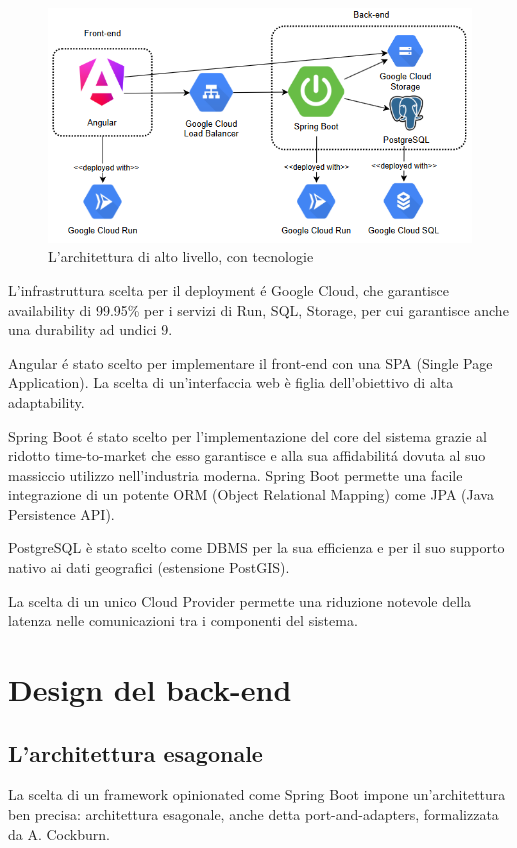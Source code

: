 \begin{figure}[h]
    \centering
    \includegraphics[width=\textwidth]{assets/diagrams/high-level-arch-tecnologies.png}
    \caption{L'architettura di alto livello, con tecnologie}
    \label{fig:Architettura di alto livello, con tecnologie}
\end{figure}

L'infrastruttura scelta per il deployment é Google Cloud, che garantisce availability 
di 99.95\% per i servizi di Run, SQL, Storage, per cui garantisce anche una durability 
ad undici 9.

Angular é stato scelto per implementare il front-end con una SPA (Single Page 
Application). La scelta di un'interfaccia web è figlia dell'obiettivo di alta 
adaptability.

Spring Boot é stato scelto per l'implementazione del core del sistema grazie al ridotto 
time-to-market che esso garantisce e alla sua affidabilitá dovuta al suo massiccio 
utilizzo nell'industria moderna. Spring Boot permette una facile integrazione di un 
potente ORM (Object Relational Mapping) come JPA (Java Persistence API).

PostgreSQL è stato scelto come DBMS per la sua efficienza e per il suo supporto nativo 
ai dati geografici (estensione PostGIS).

La scelta di un unico Cloud Provider permette una riduzione notevole della latenza nelle 
comunicazioni tra i componenti del sistema.

\section{Design del back-end}
\subsection{L'architettura esagonale}
La scelta di un framework opinionated come Spring Boot impone un’architettura ben precisa: 
architettura esagonale, anche detta port-and-adapters, formalizzata da A. Cockburn.

